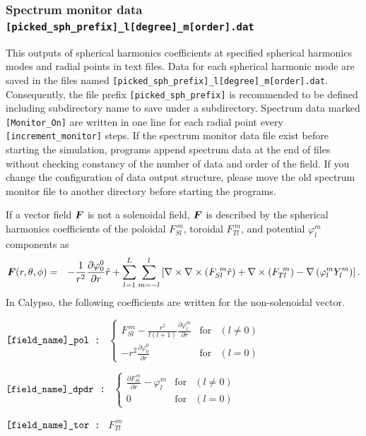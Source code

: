\subsubsection{Spectrum monitor data \\
{\tt [picked\_sph\_prefix]\_l[degree]\_m[order].dat}}
\label{sec:pickup_spectr_ctl}
This outputs of spherical harmonics coefficients at specified spherical harmonics modes and radial points in text files. Data for each spherical harmonic mode are saved in the files named {\tt [picked\_sph\_prefix]\_l[degree]\_m[order].dat}. Consequently, the file prefix {\tt [picked\_sph\_prefix]} is recommended to be defined including subdirectory name to save under a subdirectory. Spectrum data marked \verb|[Monitor_On]| are written in one line for each radial point every \verb|[increment_monitor]| steps. If the spectrum monitor data file exist before starting the simulation, programs append spectrum data at the end of files without checking constancy of the number of data and order of the field. If you change the configuration of data output structure, please move the old spectrum monitor file to another directory before starting the programs.

If a vector field $\mbox{\boldmath$F$}$ is not a solenoidal field, $\mbox{\boldmath$F$}$ is described by the spherical harmonics coefficients of the poloidal $F_{Sl}^{\ m}$, toroidal $F_{Tl}^{\ m}$, and potential $\varphi_{l}^{m}$ components as
\begin{eqnarray}
\mbox{\boldmath$F$}(r, \theta, \phi) & = &  - \frac{1}{r^{2}}\frac{\partial \varphi_{0}^{0}}{\partial r} \hat{r}
 + \sum_{l=1}^{L} \sum_{m=-l}^{l} 
\left[\nabla \times \nabla \times \left( F_{Sl}^{\ m} \hat{r} \right) +  \nabla \times \left(F_{Tl}^{\ m}\right)
 - \nabla \left(\varphi_{l}^{m} Y_{l}^{m} \right)\right].
\nonumber
\end{eqnarray}
In Calypso, the following coefficients are written for the non-solenoidal vector.
\begin{description}
\item{\tt  $\verb|[field_name]_pol|$ : }
 $\left\{\begin{array}{ccr}
\displaystyle{
F_{Sl}^{\ m} - \frac{r^{2}}{l \left(l+1\right)} \frac{\partial \varphi_{l}^{m}}{\partial r} }
& \mbox{for} & \left (l \ne 0 \right)\\
\displaystyle{
 -r^{2} \frac{\partial \varphi_{0}^{0}}{\partial r}
} & \mbox{for} & \left (l = 0 \right)
\end{array}
\right.$
\item{\tt  $\verb|[field_name]_dpdr|$ : } 
$
\left\{
\begin{array}{ccr}
\displaystyle{
\frac{\partial F_{Sl}^{\ m}}{\partial r} - \varphi_{l}^{m}}
 & \mbox{for} & \left (l \ne 0 \right)\\
 0 & \mbox{for} & \left (l = 0 \right)
\end{array}
\right. $
\item{\tt  $\verb|[field_name]_tor|$ : }  $F_{Tl}^{\ m}$
\end{description}


